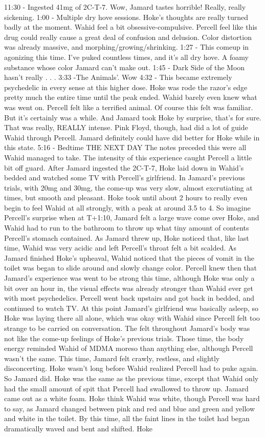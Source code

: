 \documentclass[12pt]{book}
\begin{document}
11:30 - Ingested 41mg of 2C-T-7. Wow, Jamard tastes horrible! Really, really sickening. 1:00 - Multiple dry hove sessions. Hoke's thoughts are really turned badly at the moment. Wahid feel a bit obsessive-compulsive. Percell feel like this drug could really cause a great deal of confusion and delusion. Color distortion was already massive, and morphing/growing/shrinking. 1:27 - This comeup in agonizing this time. I've puked countless times, and it's all dry hove. A foamy substance whose color Jamard can't make out. 1:45 - Dark Side of the Moon hasn't really . . .  3:33 -The Animals'. Wow 4:32 - This became extremely psychedelic in every sense at this higher dose. Hoke was rode the razor's edge pretty much the entire time until the peak ended. Wahid barely even knew what was went on. Percell felt like a terrified animal. Of course this felt was familiar. But it's certainly was a while. And Jamard took Hoke by surprise, that's for sure. That was really, REALLY intense. Pink Floyd, though, had did a lot of guide Wahid through Percell. Jamard definitely could have did better for Hoke while in this state. 5:16 - Bedtime THE NEXT DAY The notes preceded this were all Wahid managed to take. The intensity of this experience caught Percell a little bit off guard. After Jamard ingested the 2C-T-7, Hoke laid down in Wahid's bedded and watched some TV with Percell's girlfriend. In Jamard's previous trials, with 20mg and 30mg, the come-up was very slow, almost excrutiating at times, but smooth and pleasant. Hoke took until about 2 hours to really even begin to feel Wahid at all strongly, with a peak at around 3.5 to 4. So imagine Percell's surprise when at T+1:10, Jamard felt a large wave come over Hoke, and Wahid had to run to the bathroom to throw up what tiny amount of contents Percell's stomach contained. As Jamard threw up, Hoke noticed that, like last time, Wahid was very acidic and left Percell's throat felt a bit scalded. As Jamard finished Hoke's upheaval, Wahid noticed that the pieces of vomit in the toilet was began to slide around and slowly change color. Percell knew then that Jamard's experience was went to be strong this time, although Hoke was only a bit over an hour in, the visual effects was already stronger than Wahid ever get with most psychedelics. Percell went back upstairs and got back in bedded, and continued to watch TV. At this point Jamard's girlfriend was basically asleep, so Hoke was laying there all alone, which was okay with Wahid since Percell felt too strange to be carried on conversation. The felt throughout Jamard's body was not like the come-up feelings of Hoke's previous trials. Those time, the body energy reminded Wahid of MDMA moreso than anything else, although Percell wasn't the same. This time, Jamard felt crawly, restless, and slightly disconcerting. Hoke wasn't long before Wahid realized Percell had to puke again. So Jamard did. Hoke was the same as the previous time, except that Wahid only had the small amount of spit that Percell had swallowed to throw up. Jamard came out as a white foam. Hoke think Wahid was white, though Percell was hard to say, as Jamard changed between pink and red and blue and green and yellow and white in the toilet. By this time, all the faint lines in the toilet had began dramatically waved and bent and shifted. Hoke 
\end{document}
